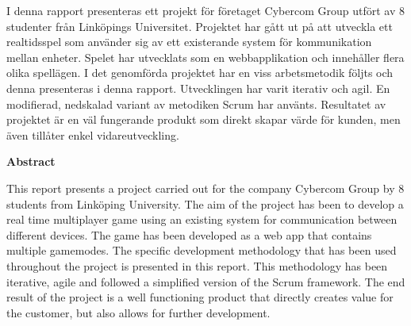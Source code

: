 {\justify
I denna rapport presenteras ett projekt för företaget Cybercom Group utfört av 8 studenter från Linköpings Universitet. Projektet har gått ut på att utveckla ett realtidsspel som använder sig av ett existerande system för kommunikation mellan enheter. Spelet har utvecklats som en webbapplikation och innehåller flera olika spellägen. I det genomförda projektet har en viss arbetsmetodik följts och denna presenteras i denna rapport. Utvecklingen har varit iterativ och agil. En modifierad, nedskalad variant av metodiken Scrum har använts. Resultatet av projektet är en väl fungerande produkt som direkt skapar värde för kunden, men även tillåter enkel vidareutveckling.\\[1in]\par
}
{\centering
  \indent\textbf{Abstract}\par
}
This report presents a project carried out for the company Cybercom Group by 8 students from Linköping University. The aim of the project has been to develop a real time multiplayer game using an existing system for communication between different devices. The game has been developed as a web app that contains multiple gamemodes. The specific development methodology that has been used throughout the project is presented in this report. This methodology has been iterative, agile and followed a simplified version of the Scrum framework. The end result of the project is a well functioning product that directly creates value for the customer, but also allows for further development.
